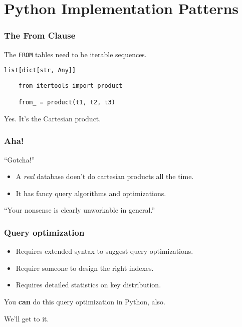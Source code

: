 \documentclass{beamer}
\begin{document}
\section{Python Implementation Patterns}

\begin{frame}[fragile]
    \frametitle{The From Clause}

    The \texttt{FROM} tables need to be iterable sequences.

    \texttt{list[dict[str, Any]]}

    \vspace{1em}
    \begin{verbatim}
    from itertools import product

    from_ = product(t1, t2, t3)
    \end{verbatim}

    \vspace{1em}
    Yes. It's the Cartesian product.

\end{frame}

\begin{frame}[fragile]
    \frametitle{Aha!}

    \begin{alertblock}{``Gotcha!''}
    \begin{itemize}
        \item A \textit{real} database doen't do cartesian products all the time.

        \item It has fancy query algorithms and optimizations. \pause
    \end{itemize}
    \end{alertblock}

    \vspace{1em}

    ``Your nonsense is clearly unworkable in general.''
\end{frame}

\begin{frame}[fragile]
    \frametitle{Query optimization}

    \begin{itemize}
    \item Requires extended syntax to suggest query optimizations.

    \item Require someone to design the right indexes.

    \item Requires detailed statistics on key distribution.
    \end{itemize}

    \vspace{1em}

    You \textbf{can} do this query optimization in Python, also.\pause
    \vspace{1em}

    We'll get to it.
\end{frame}
\end{document}
